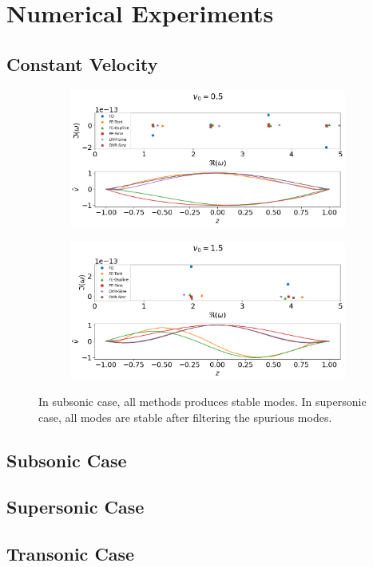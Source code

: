 \chapter{Numerical Experiments}
\section{Constant Velocity}
\begin{figure}[H]
	\centering
	\begin{subfigure}{0.5\textwidth}
		\includegraphics[width=\linewidth]{img/constant_v/constant-v-Mm=0.5}
		\caption{}
	\end{subfigure}%
	\begin{subfigure}{0.5\textwidth}
		\includegraphics[width=\linewidth]{img/constant_v/constant-v-Mm=1.5}
		\caption{}
	\end{subfigure}
	\caption{In subsonic case, all methods produces stable modes. In supersonic case, all modes are stable after filtering the spurious modes.}
	\label{fig:constant-v}
\end{figure}


\section{Subsonic Case}


\section{Supersonic Case}

\section{Transonic Case}